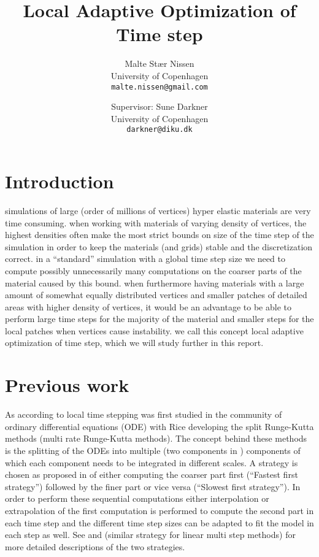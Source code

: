 \documentclass[11pt,a4paper]{article}
\title{Local Adaptive Optimization of Time step}
\author{Malte Stær Nissen\\
        University of Copenhagen\\
        \texttt{malte.nissen@gmail.com} \and
        Supervisor: Sune Darkner\\University of Copenhagen\\\texttt{darkner@diku.dk}}
\begin{document}
\maketitle

\tableofcontents

\clearpage

\section{Introduction}
simulations of large (order of millions of vertices) hyper elastic materials
are very time consuming. when working with materials of varying density
of vertices, the highest densities often make the most strict bounds on
size of the time step of the simulation in order to keep the materials (and
grids) stable and the discretization correct. in a ``standard'' simulation
with a global time step size we need to compute possibly unnecessarily many
computations on the coarser parts of the material caused by this bound.
when furthermore having materials with a large amount of somewhat equally
distributed vertices and smaller patches of detailed areas with higher density
of vertices, it would be an advantage to be able to perform large time steps
for the majority of the material and smaller steps for the local patches when
vertices cause instability. we call this concept local adaptive optimization
of time step, which we will study further in this report.

\section{Previous work}
As according to \cite{Gander:2013} local time stepping was first studied
in the community of ordinary differential equations (ODE) with Rice
\cite{rice:1960} developing the split Runge-Kutta methods (multi rate
Runge-Kutta methods). The concept behind these methods is the splitting of
the ODEs into multiple (two components in \cite{rice:1960}) components of
which each component needs to be integrated in different scales. A strategy
is chosen as proposed in \cite{Kvaernoe:1999} of either computing the coarser
part first (``Fastest first strategy'') followed by the finer part or vice
versa (``Slowest first strategy''). In order to perform these sequential
computations either interpolation or extrapolation of the first computation
is performed to compute the second part in each time step and the different
time step sizes can be adapted to fit the model in each step as well. See
\cite{Kvaernoe:1999} and \cite{Gear:1984} (similar strategy for linear multi
step methods) for more detailed descriptions of the two strategies.
\end{document}
